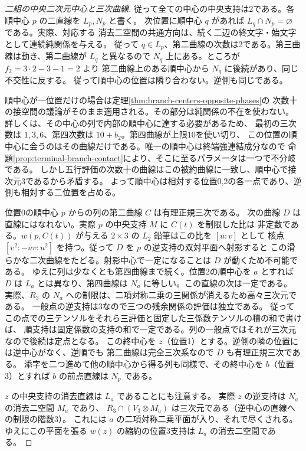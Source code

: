 \begin{proof}[二組の中央二次元中心と三次曲線]
従って全ての中心の中央支持は2である。各順中心 $p$ の二直線を $L_p,N_p$ と書く。
次位置に順中心 $q$ があれば $L_q\cap N_p=\varnothing$ である。実際、対応する
消去二空間の共通方向は、続く二辺の終文字・始文字として連続純関係を与える。
従って $q\in L_p$、第二曲線の次数は2である。第三曲線は動き、第二曲線が
$L_q$ と異なるので $N_q$ 上にある。ところが $f_2=3\cdot2-3-1=2$ より
第二曲線上のある順中心から $N_q$ に後続があり、同じ不交性に反する。
従って順中心の位置は隣り合わない。逆側も同じである。

順中心が一位置だけの場合は定理\ref{thm:branch-centers-opposite-phases}の
次数十の接空間の議論がそのまま適用される。その部分は純関係の不在を使わない。
詳しくは、その中心の列で内部の順中心に達する必要があるため、
最初の三次数は $1,3,6$、第四次数は $10+b_2$。第四曲線が上限10を使い切り、
この位置の順中心に会うのはその曲線だけである。唯一の順中心は終端強連結成分なので
命題\ref{prop:terminal-branch-contact}により、そこに至るパラメータは一つで不分岐である。
しかし五行評価の次数十の曲線はこの被約曲線に一致し、順中心で接次元3であるから矛盾する。
よって順中心は相対する位置0,2の各一点であり、逆側も相対する二位置を占める。

位置0の順中心 $p$ からの列の第二曲線 $C$ は有理正規三次である。
次の曲線 $D$ は直線にはなれない。実際 $p$ の中央支持 $M$ に $C(t)$ を制限した比は
非定数である。$w(p,C(t))$ が与える $2\times3$ の $L_2$ 鉛筆はこの比を $[u:v]$ として
核点 $[v^2:-uv:u^2]$ を持つ。従って $D$ を $p$ の逆支持の双対平面へ射影すると
この滑らかな二次曲線をたどる。射影中心で一定になることは $D$ が動くため不可能である。
ゆえに列は少なくとも第四曲線まで続く。位置2の順中心を $a$ とすれば $D$ は
$L_a$ とは異なり、第四曲線は $N_a$ に等しい。この直線の次は一定である。
実際、$R_3$ の $N_a$ への制限は、二項対称二乗の三関係が消えるため高々三次元である。
一般点の逆支持は3なので三つの残余関係の評価は独立である。
従ってこの点での三テンソルをそれら三評価と固定した三係数テンソルの積の和で書けば、
順支持は固定係数の支持の和で一定である。列の一般点ではそれが三次元なので後続は定点となる。
この終中心を $z$（位置1）とする。逆側の隣の位置には逆中心がなく、逆順でも
第二曲線は完全三次系なので $D$ も有理正規三次である。
添字を二つ進めて他の順中心から得る列も同様で、その終中心を $b$（位置3）とすれば
$b$ の前点直線は $N_p$ である。

$z$ の中央支持の消去直線は $L_a$ であることにも注意する。
実際 $z$ の逆支持は $N_a$ の消去二空間 $M_a$ であり、
$R_3\cap(V_3\otimes M_a)$ は三次元である（逆中心の直線への制限の階数3）。
これには $a$ の二項対称二乗平面が入り、それで尽くされる。
ゆえにこの平面を張る $w(z)$ の縮約の位置3支持は $L_a$ の消去二空間である。
\end{proof}

